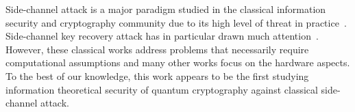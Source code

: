 Side-channel attack is a major paradigm studied in the classical information security and cryptography community due to its high level of threat in practice~\cite{side-key,naor2009public,akavia2009simultaneous,dodis2010efficient,brier2002weierstrass,joye2001hessian}. Side-channel key recovery attack has in particular drawn much attention~\cite{side-key}. However, these classical works address problems that necessarily require computational assumptions and many other works focus on the hardware aspects. To the best of our knowledge, this work appears to be the first studying information theoretical security of quantum cryptography against classical side-channel attack.


